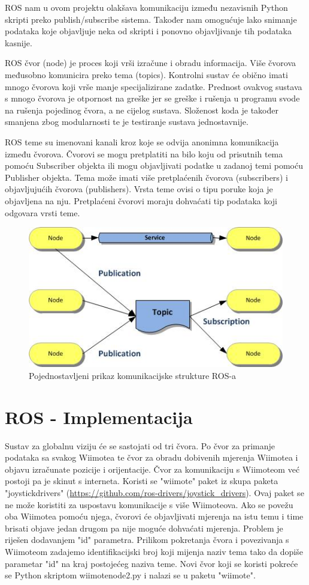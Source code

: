 \documentclass[times, utf8, diplomski]{fer}
\begin{document}
ROS nam u ovom projektu olakšava komunikaciju između nezavisnih Python skripti preko publish/subscribe sistema. Također nam omogućuje lako snimanje podataka koje objavljuje neka od skripti i ponovno objavljivanje tih podataka kasnije.

ROS čvor (node) je proces koji vrši izračune i obradu informacija. Više čvorova međusobno komunicira preko tema (topics). Kontrolni sustav će obično imati mnogo čvorova koji vrše manje specijalizirane zadatke. Prednost ovakvog sustava s mnogo čvorova je otpornost na greške jer se greške i rušenja u programu svode na rušenja pojedinog čvora, a ne cijelog sustava. Složenost koda je također smanjena zbog modularnosti te je testiranje sustava jednostavnije.

ROS teme su imenovani kanali kroz koje se odvija anonimna komunikacija između čvorova. Čvorovi se mogu pretplatiti na bilo koju od prisutnih tema pomoću Subscriber objekta ili mogu objavljivati podatke u zadanoj temi pomoću Publisher objekta. Tema može imati više pretplaćenih čvorova (subscribers) i objavljujućih čvorova (publishers). Vrsta teme ovisi o tipu poruke koja je objavljena na nju. Pretplaćeni čvorovi moraju dohvaćati tip podataka koji odgovara vrsti teme.

\begin{figure}[h]
\centering
\includegraphics[width=.7\textwidth]{ros_struktura}
\caption{Pojednostavljeni prikaz komunikacijske strukture ROS-a}
\label{fig:struktura}
\end{figure}

\section{ROS - Implementacija}
Sustav za globalnu viziju će se sastojati od tri čvora. Po čvor za primanje podataka sa svakog Wiimotea te čvor za obradu dobivenih mjerenja Wiimotea i objavu izračunate pozicije i orijentacije. Čvor za komunikaciju s Wiimoteom već postoji pa je skinut s interneta. Koristi se "wiimote" paket iz skupa paketa "joystick\textunderscore drivers" (\url{https://github.com/ros-drivers/joystick_drivers}). Ovaj paket se ne može koristiti za uspostavu komunikacije s više Wiimoteova. Ako se povežu oba Wiimotea pomoću njega, čvorovi će objavljivati mjerenja na istu temu i time brisati objave jedan drugom pa nije moguće dohvaćati mjerenja. Problem je riješen dodavanjem "id" parametra. Prilikom pokretanja čvora i povezivanja s Wiimoteom zadajemo identifikacijski broj koji mijenja naziv tema tako da dopiše parametar "id" na kraj postojećeg naziva teme. Novi čvor koji se koristi pokreće se Python skriptom wiimote\textunderscore node2.py i nalazi se u paketu "wiimote".
\end{document}
